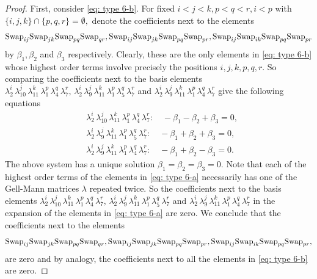 \documentclass[12pt,dvipsnames,accepted=2016-08-18,a4paper,onecolumn]{quantumarticle}
\numberwithin{equation}{section}
\theoremstyle{definition}
\begin{document}
\begin{proof}
First, consider \eqref{eq: type 6-b}. For fixed $i < j < k, p<q<r, i<p$ with $\{i,j,k\} \cap \{p,q,r\} = \emptyset,$ denote the coefficients next to the elements 
$$\textnormal{Swap}_{ij} \textnormal{Swap}_{jk} \textnormal{Swap}_{pq} \textnormal{Swap}_{qr}, \textnormal{Swap}_{ij} \textnormal{Swap}_{jk} \textnormal{Swap}_{pq} \textnormal{Swap}_{pr}, \textnormal{Swap}_{ij} \textnormal{Swap}_{ik} \textnormal{Swap}_{pq} \textnormal{Swap}_{pr}$$ 
by $\beta_1,\beta_2$ and $\beta_3$ respectively. Clearly, these are the only elements in \eqref{eq: type 6-b} whose highest order terms involve precisely the positions $i,j,k,p,q,r.$
So comparing the coefficients next to the basis elements $\lambda_2^i\, \lambda_{10}^j\, \lambda_{11}^k\, \lambda_1^p\, \lambda_4^q\, \lambda_7^r, \, \lambda_2^i\, \lambda_9^j\, \lambda_{11}^k\, \lambda_1^p\, \lambda_5^q\, \lambda_7^r$ and $\lambda_2^i\, \lambda_9^j\, \lambda_{11}^k\, \lambda_1^p\, \lambda_4^q\, \lambda_7^r$ give the following equations
	\begin{align*}
		&\lambda_2^i\, \lambda_{10}^j\, \lambda_{11}^k\, \lambda_1^p\, \lambda_4^q\, \lambda_7^r : \quad -\beta_1 -\beta_2 + \beta_3 =0,\\
		&\lambda_2^i\, \lambda_9^j\, \lambda_{11}^k\, \lambda_1^p\, \lambda_5^q\, \lambda_7^r : \quad -\beta_1 +\beta_2 + \beta_3 =0,\\
		&\lambda_2^i\, \lambda_9^j\, \lambda_{11}^k\, \lambda_1^p\, \lambda_4^q\, \lambda_7^r
: \quad -\beta_1 +\beta_2-\beta_3 =0.
	\end{align*}
 The above system has a unique solution $\beta_1=\beta_2=\beta_3=0.$
 Note that each of the highest order terms of the elements in \eqref{eq: type 6-a} necessarily has one of the Gell-Mann matrices $\lambda$ repeated twice. So the coefficients next to the basis elements $\lambda_2^i\, \lambda_{10}^j\, \lambda_{11}^k\, \lambda_1^p\, \lambda_4^q\, \lambda_7^r, \, \lambda_2^i\, \lambda_9^j\, \lambda_{11}^k\, \lambda_1^p\, \lambda_5^q\, \lambda_7^r$ and $\lambda_2^i\, \lambda_9^j\, \lambda_{11}^k\, \lambda_1^p\, \lambda_4^q\, \lambda_7^r$ in the expansion of the elements in  \eqref{eq: type 6-a} are zero.
 We conclude that the coefficients next to the elements
 $$\textnormal{Swap}_{ij} \textnormal{Swap}_{jk} \textnormal{Swap}_{pq} \textnormal{Swap}_{qr}, \textnormal{Swap}_{ij} \textnormal{Swap}_{jk} \textnormal{Swap}_{pq} \textnormal{Swap}_{pr}, \textnormal{Swap}_{ij} \textnormal{Swap}_{ik} \textnormal{Swap}_{pq} \textnormal{Swap}_{pr},$$ 
are zero and by analogy, the coefficients next to all the elements in  \eqref{eq: type 6-b} are zero.


\end{proof}
\end{document}
